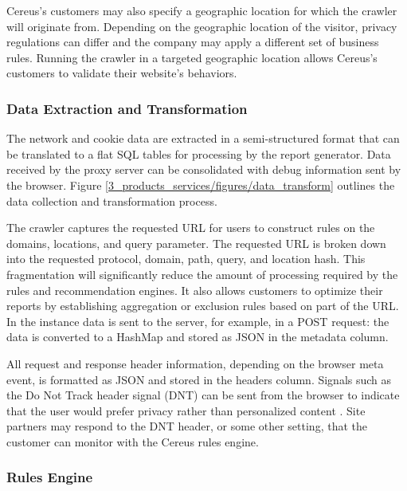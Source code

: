 Cereus's customers may also specify a geographic location for which the crawler will originate from. Depending on the geographic location of the visitor, privacy regulations can differ and the company may apply a different set of business rules. Running the crawler in a targeted geographic location allows Cereus's customers to validate their website's behaviors.

\subsubsection*{Data Extraction and Transformation}

The network and cookie data are extracted in a semi-structured format that can be translated to a flat SQL tables for processing by the report generator. Data received by the proxy server can be consolidated with debug information sent by the browser. Figure \ref{3_products_services/figures/data_transform} outlines the data collection and transformation process.

The crawler captures the requested URL for users to construct rules on the domains, locations, and query parameter. The requested URL is broken down into the requested protocol, domain, path, query, and location hash. This fragmentation will significantly reduce the amount of processing required by the rules and recommendation engines. It also allows customers to optimize their reports by establishing aggregation or exclusion rules based on part of the URL. In the instance data is sent to the server, for example, in a POST request: the data is converted to a HashMap and stored as JSON in the metadata column.

All request and response header information, depending on the browser meta event, is formatted as JSON and stored in the headers column. Signals such as the Do Not Track header signal (DNT) can be sent from the browser to indicate that the user would prefer privacy rather than personalized content \cite{mdn.2020}. Site partners may respond to the DNT header, or some other setting, that the customer can monitor with the Cereus rules engine.


\subsubsection{Rules Engine}

